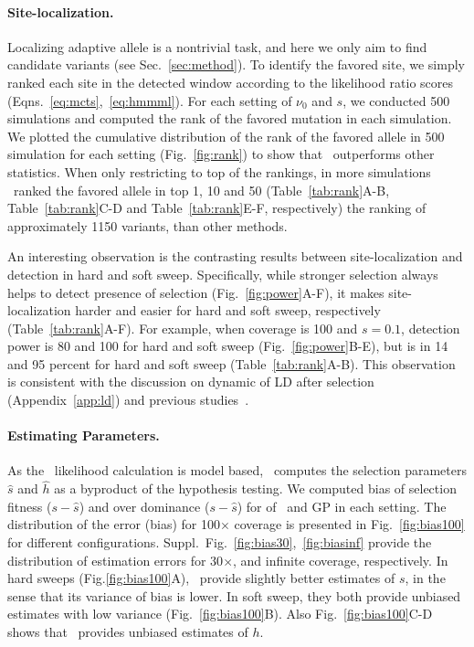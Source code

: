 \paragraph{Site-localization.}
Localizing adaptive allele is a nontrivial task, and here we only aim to find 
candidate variants (see Sec.~\ref{sec:method}). 
To identify the favored site, we simply ranked each site in the
detected window according to the likelihood ratio scores
(Eqns.~\ref{eq:mcts},~\ref{eq:hmmml}). For each setting of $\nu_0$ and $s$, 
we conducted 500 simulations and computed the rank of the favored 
mutation in each
simulation. 
We plotted the cumulative distribution of the rank of the favored allele in 500 
simulation for each setting (Fig.~\ref{fig:rank}) to show that \comale\ 
outperforms other statistics. 
When only restricting to top of the rankings, in more simulations \comale\ 
ranked the favored allele in top 1, 10 and 50 
(Table~\ref{tab:rank}A-B, Table~\ref{tab:rank}C-D and Table~\ref{tab:rank}E-F, 
respectively) the ranking of approximately 1150 variants, than other methods. 

An interesting observation is the contrasting results
between site-localization and detection in hard and soft sweep.
Specifically, while stronger selection always helps to detect presence of 
selection (Fig.~\ref{fig:power}A-F), it makes site-localization harder and 
easier for hard and soft sweep, respectively (Table~\ref{tab:rank}A-F).
For example, when coverage is 100 and $s=0.1$, detection power is 80 and 100 
for hard and soft sweep (Fig.~\ref{fig:power}B-E), but is in 14 and 95 percent 
for hard and soft sweep (Table~\ref{tab:rank}A-B).
This observation is consistent with the discussion on dynamic of LD after 
selection (Appendix~\ref{app:ld}) and previous 
studies~\cite{long2013massive,tobler2014massive}.
 
\paragraph{Estimating Parameters.}
As the \comale\ likelihood calculation is model based, \comale\
computes the selection parameters $\hat{s}$ and $\hat{h}$ as a byproduct of the 
hypothesis testing. We computed bias of selection fitness ($s-\hat{s}$) and 
over dominance ($s-\hat{s}$) for of \comale\ and GP in each setting. The 
distribution of
the error (bias) for 100$\times$ coverage is presented in
Fig.~\ref{fig:bias100} for different configurations.
Suppl.~Fig.~\ref{fig:bias30},~\ref{fig:biasinf}
provide the distribution of estimation errors for 30$\times$, and infinite 
coverage, respectively.  In hard sweeps (Fig.\ref{fig:bias100}A), \comale\ 
provide slightly better estimates of $s$, in the sense that its variance of 
bias is lower. In soft sweep, they both provide unbiased estimates with low 
variance (Fig.~\ref{fig:bias100}B).
Also Fig.~\ref{fig:bias100}C-D shows that \comale\ provides unbiased estimates 
of $h$.


